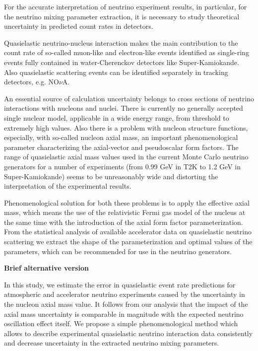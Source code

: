 For the accurate interpretation of neutrino experiment results, in particular, for the neutrino mixing parameter extraction, it is necessary to study theoretical uncertainty in predicted count rates in detectors.

Quasielastic neutrino-nucleus interaction makes the main contribution to the count rate of so-called muon-like and electron-like events identified as single-ring events fully contained in water-Cherenckov detectors like Super-Kamiokande. Also quasielastic scattering events can be identified separately in tracking detectors, e.g. NO$\nu$A.

An essential source of calculation uncertainty belongs to cross sections of neutrino interactions with nucleons and nuclei. There is currently no generally accepted single nuclear model, applicable in a wide energy range, from threshold to extremely high values. Also there is a problem with nucleon structure functions, especially, with so-called nucleon axial mass, an important phenomenological parameter characterizing the axial-vector and pseudoscalar form factors. The range of quasielastic axial mass values used in the current Monte Carlo neutrino generators for a number of experiments (from 0.99 GeV in T2K to 1.2 GeV in Super-Kamiokande) seems to be unreasonably wide and distorting the interpretation of the experimental results.

Phenomenological solution for both these problems is to apply the effective axial mass, which means the use of the relativistic Fermi gas model of the nucleus at the same time with the introduction of the axial form factor parameterization. From the statistical analysis of available accelerator data on quasielastic neutrino scattering we extract the shape of the parameterization and optimal values of the parameters, which can be recommended for use in the neutrino generators.

\textbf{Brief alternative version}

In this study, we estimate the error in quasielastic event rate predictions for atmospheric and accelerator neutrino experiments caused by the uncertainty in the nucleon axial mass value. It follows from our analysis that the impact of the axial mass uncertainty is comparable in magnitude with the expected neutrino oscillation effect itself. We propose a simple phenomenological method which allows to describe experimental quasielastic neutrino interaction data consistently and decrease uncertainty in the extracted neutrino mixing parameters.
